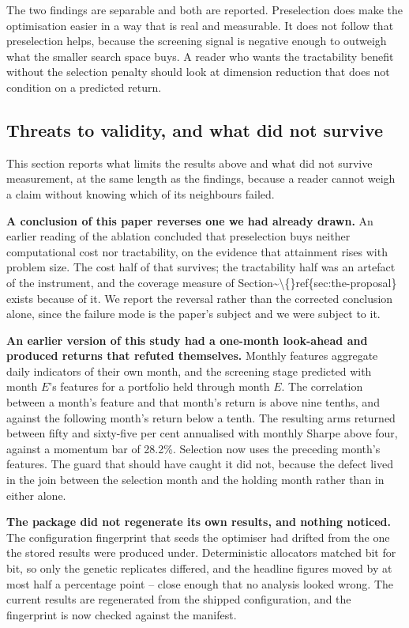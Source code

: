 \documentclass[preprint,11pt,authoryear]{elsarticle}
\begin{document}
The two findings are separable and both are reported. Preselection does make the optimisation easier in a way that is real and measurable. It does not follow that preselection helps, because the screening signal is negative enough to outweigh what the smaller search space buys. A reader who wants the tractability benefit without the selection penalty should look at dimension reduction that does not condition on a predicted return.


\subsection{Threats to validity, and what did not survive}\label{sec:threats}

This section reports what limits the results above and what did not survive measurement, at the same length as the findings, because a reader cannot weigh a claim without knowing which of its neighbours failed.

\textbf{A conclusion of this paper reverses one we had already drawn.} An earlier reading of the ablation concluded that preselection buys neither computational cost nor tractability, on the evidence that attainment rises with problem size. The cost half of that survives; the tractability half was an artefact of the instrument, and the coverage measure of Section\textasciitilde{}\textbackslash\{\}ref\{sec:the-proposal\} exists because of it. We report the reversal rather than the corrected conclusion alone, since the failure mode is the paper's subject and we were subject to it.

\textbf{An earlier version of this study had a one-month look-ahead and produced returns that refuted themselves.} Monthly features aggregate daily indicators of their own month, and the screening stage predicted with month $E$'s features for a portfolio held through month $E$. The correlation between a month's feature and that month's return is above nine tenths, and against the following month's return below a tenth. The resulting arms returned between fifty and sixty-five per cent annualised with monthly Sharpe above four, against a momentum bar of 28.2\%. Selection now uses the preceding month's features. The guard that should have caught it did not, because the defect lived in the join between the selection month and the holding month rather than in either alone.

\textbf{The package did not regenerate its own results, and nothing noticed.} The configuration fingerprint that seeds the optimiser had drifted from the one the stored results were produced under. Deterministic allocators matched bit for bit, so only the genetic replicates differed, and the headline figures moved by at most half a percentage point -- close enough that no analysis looked wrong. The current results are regenerated from the shipped configuration, and the fingerprint is now checked against the manifest.
\end{document}
